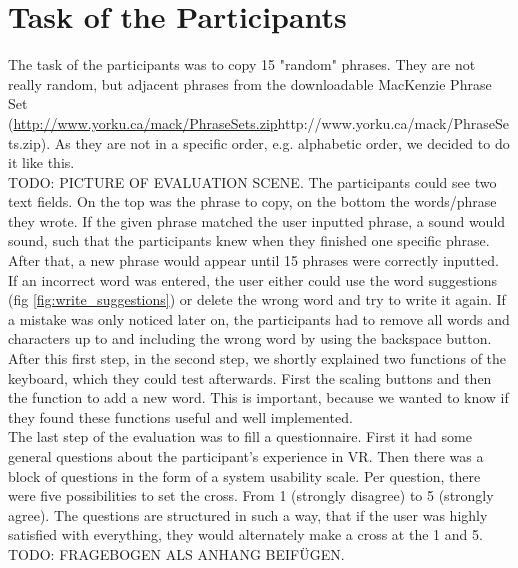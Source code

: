 \section{Task of the Participants}
The task of the participants was to copy 15 "random" phrases. They are not really random, but adjacent phrases from the downloadable MacKenzie Phrase Set (\url{http://www.yorku.ca/mack/PhraseSets.zip}{http://www.yorku.ca/mack/PhraseSets.zip}). As they are not in a specific order, e.g. alphabetic order, we decided to do it like this.\\
TODO: PICTURE OF EVALUATION SCENE.
The participants could see two text fields. On the top was the phrase to copy, on the bottom the words/phrase they wrote. If the given phrase matched the user inputted phrase, a sound would sound, such that the participants knew when they finished one specific phrase. After that, a new phrase would appear until 15 phrases were correctly inputted. If an incorrect word was entered, the user either could use the word suggestions (fig \ref{fig:write_suggestions}) or delete the wrong word and try to write it again. If a mistake was only noticed later on, the participants had to remove all words and characters up to and including the wrong word by using the backspace button.\\
After this first step, in the second step, we shortly explained two functions of the keyboard, which they could test afterwards. First the scaling buttons and then the function to add a new word. This is important, because we wanted to know if they found these functions useful and well implemented.\\
The last step of the evaluation was to fill a questionnaire. First it had some general questions about the participant's experience in VR. Then there was a block of questions in the form of a system usability scale. Per question, there were five possibilities to set the cross. From 1 (strongly disagree) to 5 (strongly agree). The questions are structured in such a way, that if the user was highly satisfied with everything, they would alternately make a cross at the 1 and 5. TODO: FRAGEBOGEN ALS ANHANG BEIFÜGEN.

